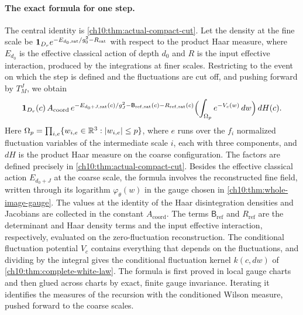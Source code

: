 \paragraph{The exact formula for one step.}
The central identity is \cref{ch10:thm:actual-compact-cut}. Let the density at the fine scale be $\mathbf 1_{D_r}e^{-E_{d_0,\mathrm{sat}}/g_0^2-R_{\mathrm{sat}}}$ with respect to the product Haar measure, where $E_{d_0}$ is the effective classical action of depth $d_0$ and $R$ is the input effective interaction, produced by the integrations at finer scales. Restricting to the event on which the step is defined and the fluctuations are cut off, and pushing forward by $T_M^J$, we obtain
\begin{equation}\label{ch10:eq:schematic}
 \mathbf 1_{D_r}(c)\,A_{\mathrm{coord}}\,e^{-E_{d_0+J,\mathrm{sat}}(c)/g_J^2-\mathsf B_{\mathrm{ref},\mathrm{sat}}(c)-R_{\mathrm{ref},\mathrm{sat}}(c)}\Bigl(\int_{\Omega_p}e^{-V_c(w)}\,dw\Bigr)\,dH(c).
\end{equation}
Here $\Omega_p=\prod_{i,e}\{w_{i,e}\in\mathbb R^3:\lvert w_{i,e}\rvert\le p\}$, where $e$ runs over the $f_i$ normalized fluctuation variables of the intermediate scale $i$, each with three components, and $dH$ is the product Haar measure on the coarse configuration. The factors are defined precisely in \cref{ch10:thm:actual-compact-cut}. Besides the effective classical action $E_{d_0+J}$ at the coarse scale, the formula involves the reconstructed fine field, written through its logarithm $\varphi_\theta(w)$ in the gauge chosen in \cref{ch10:thm:whole-image-gauge}. The values at the identity of the Haar disintegration densities and Jacobians are collected in the constant $A_{\mathrm{coord}}$. The terms $\mathsf B_{\mathrm{ref}}$ and $R_{\mathrm{ref}}$ are the determinant and Haar density terms and the input effective interaction, respectively, evaluated on the zero-fluctuation reconstruction. The conditional fluctuation potential $V_c$ contains everything that depends on the fluctuations, and dividing by the integral gives the conditional fluctuation kernel $k(c,dw)$ of \cref{ch10:thm:complete-white-law}. The formula is first proved in local gauge charts and then glued across charts by exact, finite gauge invariance. Iterating it identifies the measures of the recursion with the conditioned Wilson measure, pushed forward to the coarse scales.

